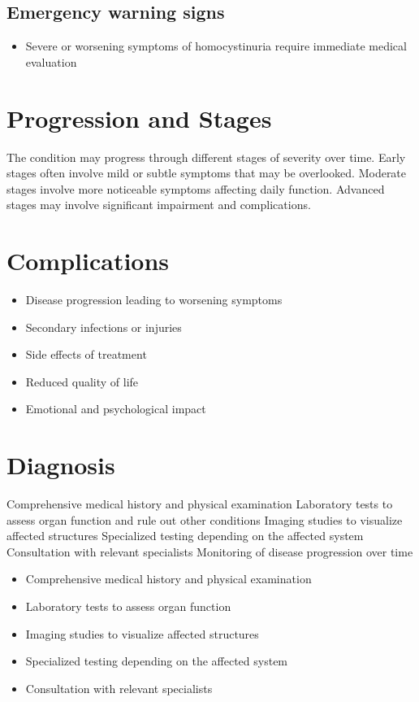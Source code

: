 \subsection{Emergency warning signs}
\begin{itemize}[noitemsep]
  \item Severe or worsening symptoms of homocystinuria require immediate medical evaluation
\end{itemize}
\section{Progression and Stages}
The condition may progress through different stages of severity over time. Early stages often involve mild or subtle symptoms that may be overlooked. Moderate stages involve more noticeable symptoms affecting daily function. Advanced stages may involve significant impairment and complications.
\section{Complications}
\begin{itemize}[noitemsep]
  \item Disease progression leading to worsening symptoms
  \item Secondary infections or injuries
  \item Side effects of treatment
  \item Reduced quality of life
  \item Emotional and psychological impact
\end{itemize}
\section{Diagnosis}
Comprehensive medical history and physical examination Laboratory tests to assess organ function and rule out other conditions Imaging studies to visualize affected structures Specialized testing depending on the affected system Consultation with relevant specialists Monitoring of disease progression over time

\begin{itemize}[noitemsep]
  \item Comprehensive medical history and physical examination
  \item Laboratory tests to assess organ function
  \item Imaging studies to visualize affected structures
  \item Specialized testing depending on the affected system
  \item Consultation with relevant specialists
\end{itemize}

